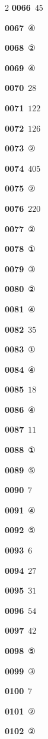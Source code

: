 \documentclass[10pt,a4paper]{article}
\begin{document}
\begin{multicols}{2}
\noindent\textbf{0066}\ $45$\par
\noindent\textbf{0067}\ ④\par
\noindent\textbf{0068}\ ②\par
\noindent\textbf{0069}\ ④\par
\noindent\textbf{0070}\ $28$\par
\noindent\textbf{0071}\ $122$\par
\noindent\textbf{0072}\ $126$\par
\noindent\textbf{0073}\ ②\par
\noindent\textbf{0074}\ $405$\par
\noindent\textbf{0075}\ ②\par
\noindent\textbf{0076}\ $220$\par
\noindent\textbf{0077}\ ②\par
\noindent\textbf{0078}\ ①\par
\noindent\textbf{0079}\ ③\par
\noindent\textbf{0080}\ ②\par
\noindent\textbf{0081}\ ④\par
\noindent\textbf{0082}\ $35$\par
\noindent\textbf{0083}\ ①\par
\noindent\textbf{0084}\ ④\par
\noindent\textbf{0085}\ $18$\par
\noindent\textbf{0086}\ ④\par
\noindent\textbf{0087}\ $11$\par
\noindent\textbf{0088}\ ①\par
\noindent\textbf{0089}\ ⑤\par
\noindent\textbf{0090}\ $7$\par
\noindent\textbf{0091}\ ④\par
\noindent\textbf{0092}\ ⑤\par
\noindent\textbf{0093}\ $6$\par
\noindent\textbf{0094}\ $27$\par
\noindent\textbf{0095}\ $31$\par
\noindent\textbf{0096}\ $54$\par
\noindent\textbf{0097}\ $42$\par
\noindent\textbf{0098}\ ⑤\par
\noindent\textbf{0099}\ ③\par
\noindent\textbf{0100}\ $7$\par
\noindent\textbf{0101}\ ②\par
\noindent\textbf{0102}\ ②\par

\end{multicols}
\end{document}
